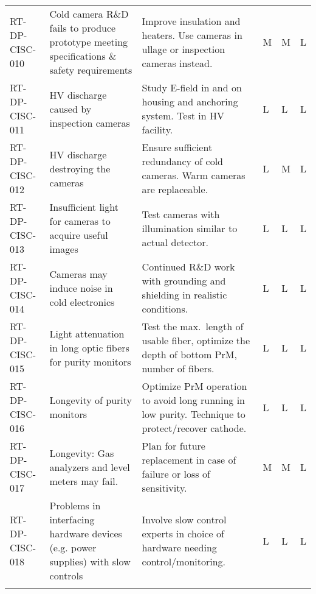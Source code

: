 \begin{longtable}{p{}p{}p{}p{}p{}p{}}
RT-DP-CISC-010 & Cold camera R\&D fails to produce prototype meeting specifications \& safety requirements & Improve insulation and heaters. Use cameras in ullage or inspection cameras instead. & M & M & L \\  \colhline
RT-DP-CISC-011 & HV discharge caused by inspection cameras & Study E-field in and on housing and anchoring system. Test in HV facility. & L & L & L \\  \colhline
RT-DP-CISC-012 & HV discharge destroying the cameras & Ensure sufficient redundancy of cold cameras. Warm cameras are replaceable. & L & M & L \\  \colhline
RT-DP-CISC-013 & Insufficient light for cameras to acquire useful images & Test cameras with illumination similar to actual detector. & L & L & L \\  \colhline
RT-DP-CISC-014 & Cameras may induce noise in cold electronics & Continued R\&D work with grounding and shielding in realistic conditions. & L & L & L \\  \colhline
RT-DP-CISC-015 & Light attenuation in long optic fibers for purity monitors  & Test the max.\ length of usable fiber, optimize the depth of bottom PrM, number of fibers. & L & L & L \\  \colhline
RT-DP-CISC-016 & Longevity of purity monitors & Optimize PrM operation to avoid long running in low purity. Technique to protect/recover cathode. & L & L & L \\  \colhline
RT-DP-CISC-017 & Longevity: Gas analyzers and level meters may fail. & Plan for future replacement in case of failure or loss of sensitivity.  & M & M & L \\  \colhline
RT-DP-CISC-018 & Problems in interfacing  hardware devices (e.g. power supplies) with slow controls & Involve slow control experts in choice of hardware needing control/monitoring.
 & L & L & L \\  \colhline

\label{tab:risks:DP-FD-CISC}
\end{longtable}